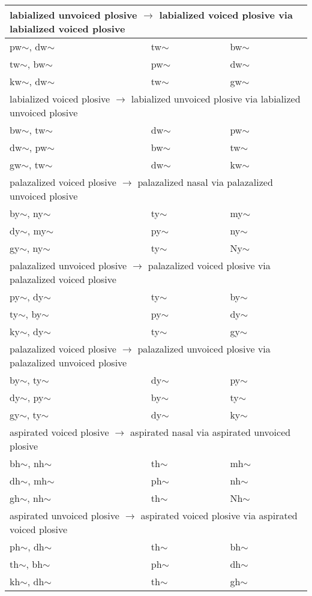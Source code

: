 \documentclass[6pt]{article}
\begin{document}
\begin{longtable}{ l | l | l }
 \hline \multicolumn{3}{l}{labialized unvoiced plosive $\rightarrow$ labialized voiced plosive via labialized voiced plosive}\\  \hline
pw$\sim$, dw$\sim$ & tw$\sim$ & bw$\sim$ \\
tw$\sim$, bw$\sim$ & pw$\sim$ & dw$\sim$ \\
kw$\sim$, dw$\sim$ & tw$\sim$ & gw$\sim$ \\
 \hline \multicolumn{3}{l}{labialized voiced plosive $\rightarrow$ labialized unvoiced plosive via labialized unvoiced plosive}\\  \hline
bw$\sim$, tw$\sim$ & dw$\sim$ & pw$\sim$ \\
dw$\sim$, pw$\sim$ & bw$\sim$ & tw$\sim$ \\
gw$\sim$, tw$\sim$ & dw$\sim$ & kw$\sim$ \\
 \hline \multicolumn{3}{l}{palazalized voiced plosive $\rightarrow$  palazalized nasal via palazalized unvoiced plosive}\\  \hline
by$\sim$, ny$\sim$ & ty$\sim$ & my$\sim$ \\
dy$\sim$, my$\sim$ & py$\sim$ & ny$\sim$ \\
gy$\sim$, ny$\sim$ & ty$\sim$ & Ny$\sim$ \\
 \hline \multicolumn{3}{l}{palazalized unvoiced plosive $\rightarrow$ palazalized voiced plosive via palazalized voiced plosive}\\  \hline
py$\sim$, dy$\sim$ & ty$\sim$ & by$\sim$ \\
ty$\sim$, by$\sim$ & py$\sim$ & dy$\sim$ \\
ky$\sim$, dy$\sim$ & ty$\sim$ & gy$\sim$ \\
 \hline \multicolumn{3}{l}{palazalized voiced plosive $\rightarrow$ palazalized unvoiced plosive via palazalized unvoiced plosive}\\  \hline
by$\sim$, ty$\sim$ & dy$\sim$ & py$\sim$ \\
dy$\sim$, py$\sim$ & by$\sim$ & ty$\sim$ \\
gy$\sim$, ty$\sim$ & dy$\sim$ & ky$\sim$ \\
 \hline \multicolumn{3}{l}{aspirated voiced plosive $\rightarrow$  aspirated nasal via aspirated unvoiced plosive}\\  \hline
bh$\sim$, nh$\sim$ & th$\sim$ & mh$\sim$ \\
dh$\sim$, mh$\sim$ & ph$\sim$ & nh$\sim$ \\
gh$\sim$, nh$\sim$ & th$\sim$ & Nh$\sim$ \\
 \hline \multicolumn{3}{l}{aspirated unvoiced plosive $\rightarrow$ aspirated voiced plosive via aspirated voiced plosive}\\  \hline
ph$\sim$, dh$\sim$ & th$\sim$ & bh$\sim$ \\
th$\sim$, bh$\sim$ & ph$\sim$ & dh$\sim$ \\
kh$\sim$, dh$\sim$ & th$\sim$ & gh$\sim$ \\


\end{longtable}
\end{document}
